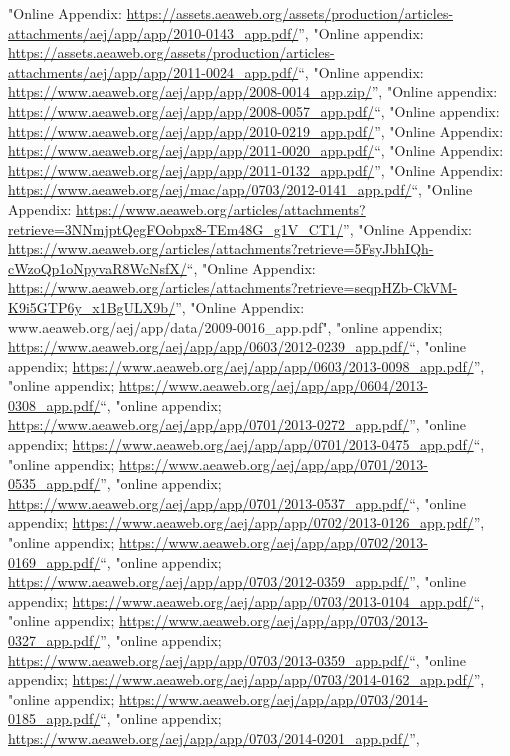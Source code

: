 \documentclass[]{article}
\begin{document}
\begin{itemize}
  "Online Appendix:
  \url{https://assets.aeaweb.org/assets/production/articles-attachments/aej/app/app/2010-0143_app.pdf/}'',
  "Online appendix:
  \url{https://assets.aeaweb.org/assets/production/articles-attachments/aej/app/app/2011-0024_app.pdf/}``,
  "Online appendix:
  \url{https://www.aeaweb.org/aej/app/app/2008-0014_app.zip/}'', "Online
  appendix:
  \url{https://www.aeaweb.org/aej/app/app/2008-0057_app.pdf/}``, "Online
  appendix:
  \url{https://www.aeaweb.org/aej/app/app/2010-0219_app.pdf/}'', "Online
  Appendix:
  \url{https://www.aeaweb.org/aej/app/app/2011-0020_app.pdf/}``, "Online
  Appendix:
  \url{https://www.aeaweb.org/aej/app/app/2011-0132_app.pdf/}'', "Online
  Appendix:
  \url{https://www.aeaweb.org/aej/mac/app/0703/2012-0141_app.pdf/}``,
  "Online Appendix:
  \url{https://www.aeaweb.org/articles/attachments?retrieve=3NNmjptQegFOobpx8-TEm48G_g1V_CT1/}'',
  "Online Appendix:
  \url{https://www.aeaweb.org/articles/attachments?retrieve=5FsyJbhIQh-cWzoQp1oNpyvaR8WcNsfX/}``,
  "Online Appendix:
  \url{https://www.aeaweb.org/articles/attachments?retrieve=seqpHZb-CkVM-K9i5GTP6y_x1BgULX9b/}'',
  "Online Appendix: www.aeaweb.org/aej/app/data/2009-0016\_app.pdf",
  "online appendix;
  \url{https://www.aeaweb.org/aej/app/app/0603/2012-0239_app.pdf/}``,
  "online appendix;
  \url{https://www.aeaweb.org/aej/app/app/0603/2013-0098_app.pdf/}'',
  "online appendix;
  \url{https://www.aeaweb.org/aej/app/app/0604/2013-0308_app.pdf/}``,
  "online appendix;
  \url{https://www.aeaweb.org/aej/app/app/0701/2013-0272_app.pdf/}'',
  "online appendix;
  \url{https://www.aeaweb.org/aej/app/app/0701/2013-0475_app.pdf/}``,
  "online appendix;
  \url{https://www.aeaweb.org/aej/app/app/0701/2013-0535_app.pdf/}'',
  "online appendix;
  \url{https://www.aeaweb.org/aej/app/app/0701/2013-0537_app.pdf/}``,
  "online appendix;
  \url{https://www.aeaweb.org/aej/app/app/0702/2013-0126_app.pdf/}'',
  "online appendix;
  \url{https://www.aeaweb.org/aej/app/app/0702/2013-0169_app.pdf/}``,
  "online appendix;
  \url{https://www.aeaweb.org/aej/app/app/0703/2012-0359_app.pdf/}'',
  "online appendix;
  \url{https://www.aeaweb.org/aej/app/app/0703/2013-0104_app.pdf/}``,
  "online appendix;
  \url{https://www.aeaweb.org/aej/app/app/0703/2013-0327_app.pdf/}'',
  "online appendix;
  \url{https://www.aeaweb.org/aej/app/app/0703/2013-0359_app.pdf/}``,
  "online appendix;
  \url{https://www.aeaweb.org/aej/app/app/0703/2014-0162_app.pdf/}'',
  "online appendix;
  \url{https://www.aeaweb.org/aej/app/app/0703/2014-0185_app.pdf/}``,
  "online appendix;
  \url{https://www.aeaweb.org/aej/app/app/0703/2014-0201_app.pdf/}'',

\end{itemize}
\end{document}
